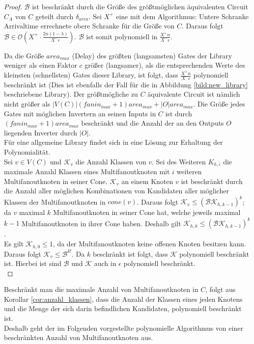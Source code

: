 \documentclass[11pt, a4paper, german]{article}
\begin{document}
\begin{proof}
$\mathcal{B}$ ist beschränkt durch die Größe des größtmöglichen äquivalenten Circuit $C_A$ von $C$ geteilt durch $\delta_{area}$. Sei $X^+$ eine mit dem Algorithmus: Untere Schranke Arrivaltime errechnete obere Schranke für die Größe von $C$. Daraus folgt $\mathcal{B} \in \mathcal{O}(X^+ \cdot \frac{2n(1-\lambda)}{X^- \epsilon})$. $\mathcal{B} $ ist somit polynomiell in $\frac{X^+ n}{X^- \epsilon}$. 



Da die Größe $area_{max}$ (Delay) des größten (langsamsten) Gates der Library weniger als einen Faktor $c$ größer (langsamer), als die entsprechenden Werte des kleinsten (schnellsten) Gates dieser Library, ist folgt, dass $\frac{X^+ n}{X^- \epsilon}$ polynomiell beschränkt ist (Dies ist ebenfalls der Fall für die in Abbildung \ref{bild:new_library} beschriebene Library).  Der größtmögliche zu $C$ äquivalente Circuit ist nämlich nicht größer als $|V(C)|(fanin_{max}+1)area_{max} + |O|area_{max}$. Die Größe jedes Gates mit möglichen Invertern an seinen Inputs in $C$ ist durch $(fanin_{max}+1)area_{max}$ beschränkt und die Anzahl der an den Outputs $O$ liegenden Inverter durch $|O|$.\\
Für eine allgemeine Library findet sich in \cite{Elbert} eine Lösung zur Erhaltung der Polynomialität.\\
Sei $v \in V(C)$ und $\mathcal{K}_v$ die Anzahl Klassen von $v$. Sei des Weiteren $K_{h,i}$ die maximale Anzahl Klassen eines Multifanoutknoten mit $i$ weiteren Multifanoutknoten in seiner Cone. 
$\mathcal{K}_v$ an einem Knoten $v$ ist beschränkt durch die Anzahl aller möglichen Kombinationen von Kandidaten aller möglicher Klassen der Multifanoutknoten in $cone(v)$. Daraus folgt $\mathcal{K}_v \leq (\mathcal{BK}_{h,k-1})^k$; da $v$ maximal $k$ Multifanoutknoten in seiner Cone hat, welche jeweils maximal $k-1$ Multifanoutknoten in ihrer Cone haben. Deshalb gilt $\mathcal{K}_{h,k} \leq (\mathcal{BK}_{h,k-1})^k$.\\
Es gilt $\mathcal{K}_{h,0} \leq 1$, da der Multifanoutknoten keine offenen Knoten besitzen kann. \\
Daraus folgt $\mathcal{K}_v \leq \mathcal{B}^{k!}$. Da $k$ beschränkt ist folgt, dass $\mathcal{K}$ polynomiell beschränkt ist. Hierbei ist sind $\mathcal{B}$ und $\mathcal{K}$ auch in $\epsilon$ polynomiell beschränkt. \\
\end{proof}

Beschränkt man die maximale Anzahl von Multifanoutknoten in $C$, folgt aus Korollar \ref{cor:anzahl_klassen}, dass die Anzahl der Klassen eines jeden Knotens und die Menge der sich darin befindlichen Kandidaten, polynomiell beschränkt ist. \\
Deshalb geht der im Folgenden vorgestellte polynomielle Algorithmus von einer beschränkten Anzahl von Multifanoutknoten aus.\\ 
\end{document}
